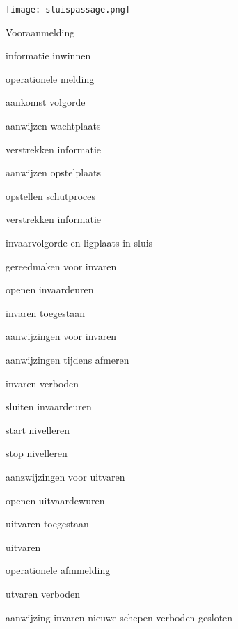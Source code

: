 \texttt{[image: sluispassage.png]}


\begin{itemize}
	\begin{minipage}{0.4\linewidth}
		\item Vooraanmelding
		\item informatie inwinnen
		\item operationele melding
		\item aankomst volgorde
		\item aanwijzen wachtplaats
		\item verstrekken informatie
		\item aanwijzen opstelplaats
		\item opstellen schutproces
		\item verstrekken informatie
		\item invaarvolgorde en ligplaats in sluis
		
	\end{minipage}
	\begin{minipage}{0.4\linewidth}
		
		\item gereedmaken voor invaren
		\item openen invaardeuren
		\item invaren toegestaan
		\item aanwijzingen voor invaren
		\item aanwijzingen tijdens afmeren
		\item invaren verboden
		\item sluiten invaardeuren
		\item start nivelleren
		\item stop nivelleren
		\item aanzwijzingen voor uitvaren
		\item openen uitvaardewuren
		\item uitvaren toegestaan
		
	\end{minipage}
	\begin{minipage}{0.4\linewidth}
		\item uitvaren
		\item operationele afmmelding
		\item utvaren verboden
		\item aanwijzing invaren nieuwe schepen
		\invaren verboden
		\deuren gesloten
	\end{minipage}
\end{itemize}


